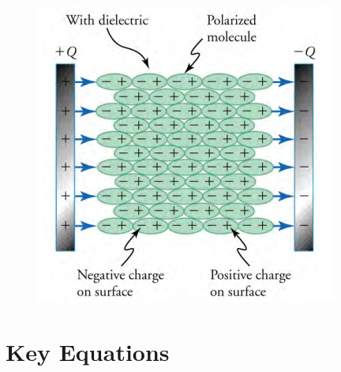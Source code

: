 \documentclass{beamer}
\begin{document}
\begin{frame}
    
      \begin{figure}
          \centering
          \includegraphics[width=0.7\linewidth]{dialelecr.png}
      \end{figure}
    
\end{frame}

\section{Key Equations}
\end{document}
